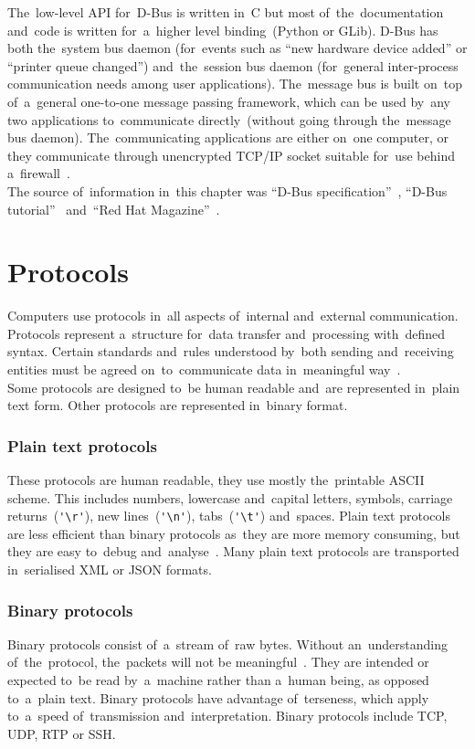 The~low-level API for~D-Bus is written in~C but most
of~the~documentation and~code is written for~a~higher level binding~(Python or GLib).
D-Bus has both the~system bus daemon (for~events such as ``new hardware device
added'' or ``printer queue changed'') and~the~session bus daemon (for~general
inter-process communication needs among user \mbox{applications}). The~message bus
is built on~top of~a~general one-to-one message passing framework, which can be
used by~any two applications to~communicate directly~(without going through
the~message bus daemon). The~communicating applications are either on~one computer,
or they communicate through unencrypted TCP/IP socket suitable for~use behind
a~firewall~\cite{DBUS}.\\

The source of~information in~this chapter was ``D-Bus specification''~\cite{DBUSspec},
``D-Bus tutorial''~\cite{DBUStutorial} and~``Red Hat Magazine''~\cite{DBUSrh}.


\section{Protocols}
Computers use protocols in~all aspects of~internal and~external communication.
Protocols represent a~structure for~data transfer and~processing with~defined
syntax. Certain standards and~rules understood by~both sending and~receiving
entities must be agreed on~to~communicate data in~meaningful way~\cite{Fuzzing}.\\

Some protocols are designed to~be human readable and~are represented in~plain
text form. Other protocols are represented in~binary format.

\subsubsection{Plain text protocols}
These protocols are human readable, they use mostly the~printable ASCII scheme.
This includes numbers, lowercase and~capital letters, symbols, carriage
returns~(\verb|'\r'|), new lines~(\verb|'\n'|), tabs~(\verb|'\t'|) and~spaces.
Plain text protocols are less efficient than binary protocols as~they are more
memory consuming, but they are easy to~debug and~analyse~\cite{Fuzzing}. Many
plain text protocols are transported in~serialised XML or JSON formats.

\subsubsection{Binary protocols}
Binary protocols consist of~a~stream of~raw bytes. Without an~understanding
of~the~protocol, the~packets will not be meaningful~\cite{Fuzzing}. They are
intended or expected to~be read by~a~machine rather than a~human being, as
opposed to~a~plain text. Binary protocols have advantage of~terseness, which
apply to~a~speed of~transmission and~interpretation. Binary protocols include
TCP, UDP, RTP or SSH.



